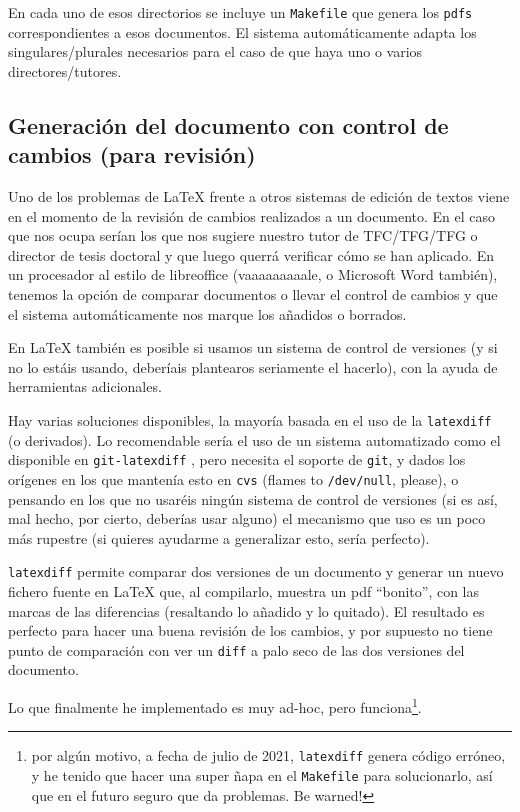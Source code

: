 En cada uno de esos directorios se incluye un \texttt{Makefile} que genera los \texttt{pdfs} correspondientes a esos documentos. El sistema automáticamente adapta los singulares/plurales necesarios para el caso de que haya uno o varios directores/tutores.


\subsection{Generación del documento con control de cambios (para revisión)}
\label{sec:control-de-cambios}

Uno de los problemas de \LaTeX{} frente a otros sistemas de edición de textos viene en el momento de la revisión de cambios realizados a un documento. En el caso que nos ocupa serían los que nos sugiere nuestro tutor de TFC/TFG/TFG o director de tesis doctoral y que luego querrá verificar cómo se han aplicado. En un procesador al estilo de libreoffice (vaaaaaaaaale, o Microsoft Word también), tenemos la opción de comparar documentos o llevar el control de cambios y que el sistema automáticamente nos marque los añadidos o borrados.

En \LaTeX{} también es posible si usamos un sistema de control de versiones (y si no lo estáis usando, deberíais plantearos seriamente el hacerlo), con la ayuda de herramientas adicionales.

Hay varias soluciones disponibles, la mayoría basada en el uso de la \texttt{latexdiff}~\cite{latexdiff} (o derivados). Lo recomendable sería el uso de un sistema automatizado como el disponible en \texttt{git-latexdiff} \cite{git-latexdiff}, pero necesita el soporte de \texttt{git}, y dados los orígenes en los que mantenía esto en \texttt{cvs} (flames to \texttt{/dev/null}, please), o pensando en los que no usaréis ningún sistema de control de versiones (si es así, mal hecho, por cierto, deberías usar alguno) el mecanismo que uso es un poco más rupestre (si quieres ayudarme a generalizar esto, sería perfecto).

\texttt{latexdiff} permite comparar dos versiones de un documento y generar un nuevo fichero fuente en \LaTeX{} que, al compilarlo, muestra un pdf ``bonito'', con las marcas de las diferencias (resaltando lo añadido y lo quitado). El resultado es perfecto para hacer una buena revisión de los cambios, y por supuesto no tiene punto de comparación con ver un \texttt{diff} a palo seco de las dos versiones del documento.

Lo que finalmente he implementado es muy ad-hoc, pero funciona\footnote{por algún motivo, a fecha de julio de 2021, \texttt{latexdiff} genera código erróneo, y he tenido que hacer una super ñapa en el \texttt{Makefile} para solucionarlo, así que en el futuro seguro que da problemas. Be warned!}.

